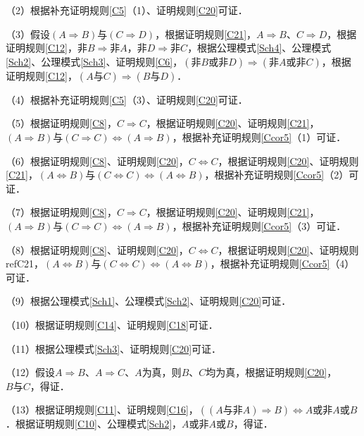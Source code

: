 \documentclass[12pt, a4paper, oneside]{book}
\begin{document}
			\par
			（2）根据补充证明规则\ref{C5}（1）、证明规则\ref{C20}可证．
			\par
			（3）假设$(A\Rightarrow B)\text{与}(C\Rightarrow D)$，根据证明规则\ref{C21}，$A\Rightarrow B$、$C\Rightarrow D$，根据证明规则\ref{C12}，$\text{非}B\Rightarrow \text{非}A$，$\text{非}D\Rightarrow \text{非}C$，根据公理模式\ref{Sch4}、公理模式\ref{Sch2}、公理模式\ref{Sch3}、证明规则\ref{C6}，$(\text{非}B\text{或}\text{非}D)\Rightarrow (\text{非}A\text{或}\text{非}C)$，根据证明规则\ref{C12}，$(A\text{与}C)\Rightarrow (B\text{与}D)$．
			\par
			（4）根据补充证明规则\ref{C5}（3）、证明规则\ref{C20}可证．
			\par
			（5）根据证明规则\ref{C8}，$C\Rightarrow C$，根据证明规则\ref{C20}、证明规则\ref{C21}，$(A\Rightarrow B)\text{与}(C\Rightarrow C)\Leftrightarrow (A\Rightarrow B)$，根据补充证明规则\ref{Ccor5}（1）可证．
			\par
			（6）根据证明规则\ref{C8}、证明规则\ref{C20}，$C\Leftrightarrow C$，根据证明规则\ref{C20}、证明规则\ref{C21}，$(A\Leftrightarrow B)\text{与}(C\Leftrightarrow C)\Leftrightarrow (A\Leftrightarrow B)$，根据补充证明规则\ref{Ccor5}（2）可证．
			\par
			（7）根据证明规则\ref{C8}，$C\Rightarrow C$，根据证明规则\ref{C20}、证明规则\ref{C21}，$(A\Rightarrow B)\text{与}(C\Rightarrow C)\Leftrightarrow (A\Rightarrow B)$，根据补充证明规则\ref{Ccor5}（3）可证．
			\par
			（8）根据证明规则\ref{C8}、证明规则\ref{C20}，$C\Leftrightarrow C$，根据证明规则\ref{C20}、证明规则ref{C21}，$(A\Leftrightarrow B)\text{与}(C\Leftrightarrow C)\Leftrightarrow (A\Leftrightarrow B)$，根据补充证明规则\ref{Ccor5}（4）可证．
			\par
			（9）根据公理模式\ref{Sch1}、公理模式\ref{Sch2}、证明规则\ref{C20}可证．
			\par
			（10）根据证明规则\ref{C14}、证明规则\ref{C18}可证．
			\par
			（11）根据公理模式\ref{Sch3}、证明规则\ref{C20}可证．
			\par
			（12）假设$A\Rightarrow B$、$A\Rightarrow C$、$A$为真，则$B$、$C$均为真，根据证明规则\ref{C20}，$B\text{与}C$，得证．
			\par
			（13）根据证明规则\ref{C11}、证明规则\ref{C16}，$((A\text{与}\text{非}A)\Rightarrow B)\Leftrightarrow A\text{或}\text{非}A\text{或}B$．根据证明规则\ref{C10}、公理模式\ref{Sch2}，$A\text{或}\text{非}A\text{或}B$，得证．
			\par
\end{document}
